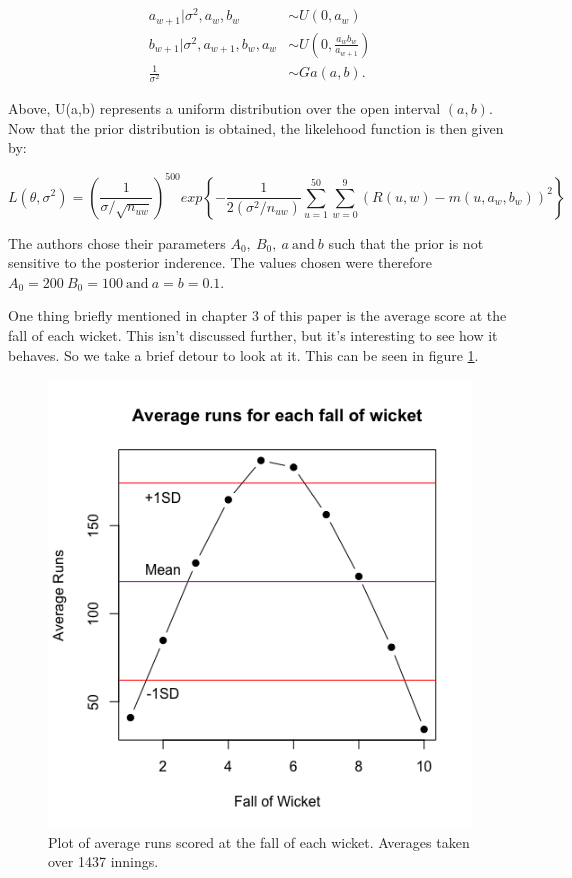 \begin{align}
    a_{w+1}|\sigma^2,a_w,b_w &\sim U(0,a_w) \\
    b_{w+1}|\sigma^2,a_{w+1},b_w,a_w &\sim U\left(0,\frac{a_wb_w}{a_{w+1}}\right) \\
    \frac{1}{\sigma^2} &\sim Ga(a,b).
\end{align}

Above, U(a,b) represents a uniform distribution over the open interval $(a,b)$. Now that the prior distribution is obtained, the likelehood function is then 
given by:

\begin{equation}
    L(\theta,\sigma^2) = \left( \frac{1}{\sigma / \sqrt{n_{uw}}} \right)^{500} exp \left\{ - \frac{1}{2(\sigma^2 / n_{uw})} \sum_{u=1}^{50} \sum_{w=0}^9 (R(u,w)-m(u,a_w,b_w))^2  \right\}
\end{equation}

The authors chose their parameters $A_0, \ B_0, \ a \ \text{and} \ b$ such that the prior is not sensitive to the posterior inderence. The values chosen
were therefore $A_0=200 \ B_0=100 \ \text{and} \ a=b=0.1$.

One thing briefly mentioned in chapter 3 of this paper is the average score at the fall of each wicket. This isn't discussed further, but it's interesting to see how it behaves.
So we take a brief detour to look at it. This can be seen in figure \ref{avgrunsfow}.

\begin{figure}[h]
    \centering
    \includegraphics[scale=0.6]{figures/avgrunsfow.png}
    \caption{Plot of average runs scored at the fall of each wicket. Averages taken over 1437 innings.}
    \label{avgrunsfow}
\end{figure}

